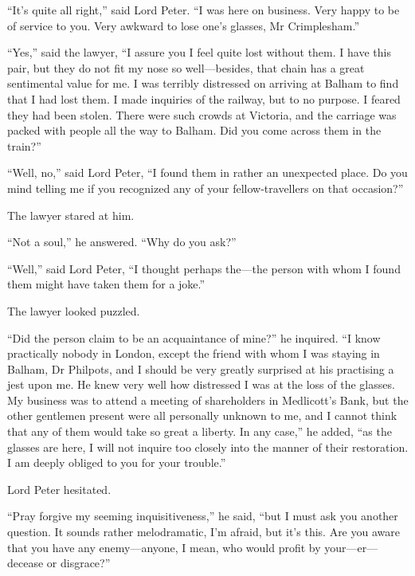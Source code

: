 \enquote{It’s quite all right,} said Lord Peter. \enquote{I was here on business. Very happy to be of service to you. Very awkward to lose one’s glasses, Mr Crimplesham.}

\enquote{Yes,} said the lawyer, \enquote{I assure you I feel quite lost without them. I have this pair, but they do not fit my nose so well\allowbreak---\allowbreak besides, that chain has a great sentimental value for me. I was terribly distressed on arriving at Balham to find that I had lost them. I made inquiries of the railway, but to no purpose. I feared they had been stolen. There were such crowds at Victoria, and the carriage was packed with people all the way to Balham. Did you come across them in the train?}

\enquote{Well, no,} said Lord Peter, \enquote{I found them in rather an unexpected place. Do you mind telling me if you recognized any of your fellow-travellers on that occasion?}

The lawyer stared at him.

\enquote{Not a soul,} he answered. \enquote{Why do you ask?}

\enquote{Well,} said Lord Peter, \enquote{I thought perhaps the\allowbreak---\allowbreak the person with whom I found them might have taken them for a joke.}

The lawyer looked puzzled.

\enquote{Did the person claim to be an acquaintance of mine?} he inquired. \enquote{I know practically nobody in London, except the friend with whom I was staying in Balham, Dr Philpots, and I should be very greatly surprised at his practising a jest upon me. He knew very well how distressed I was at the loss of the glasses. My business was to attend a meeting of shareholders in Medlicott’s Bank, but the other gentlemen present were all personally unknown to me, and I cannot think that any of them would take so great a liberty. In any case,} he added, \enquote{as the glasses are here, I will not inquire too closely into the manner of their restoration. I am deeply obliged to you for your trouble.}

Lord Peter hesitated.

\enquote{Pray forgive my seeming inquisitiveness,} he said, \enquote{but I must ask you another question. It sounds rather melodramatic, I’m afraid, but it’s this. Are you aware that you have any enemy\allowbreak---\allowbreak anyone, I mean, who would profit by your\allowbreak---\allowbreak er---decease or disgrace?}

